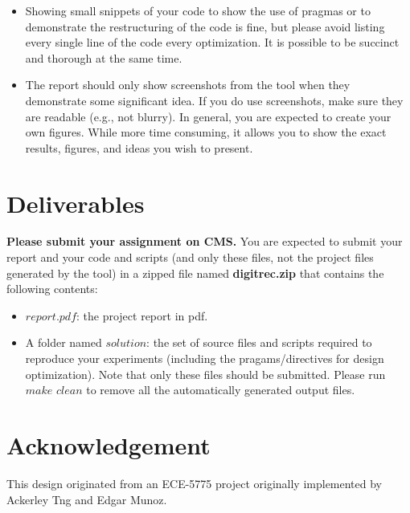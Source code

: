 \documentclass[paper=letter, fontsize=10pt]{scrartcl} %
\numberwithin{equation}{section} %
\numberwithin{figure}{section} %
\numberwithin{table}{section} %
\begin{document}
\begin{itemize}
\item Showing small snippets of your code to show the use of pragmas or to demonstrate the restructuring of the code is fine, but please avoid listing every single line of the code every optimization. It is possible to be succinct and thorough at the same time.

\item The report should only show screenshots from the tool when they demonstrate some significant idea. If you do use screenshots, make sure they are readable (e.g., not blurry). In general, you are expected to create your own figures. While more time consuming, it allows you to show the exact results, figures, and ideas you wish to present.

\end{itemize}

\section{Deliverables}
\label{deliverables}
\textbf{Please submit your assignment on CMS.} You are expected to submit your report and your code and scripts (and only these files, not the project files generated by the tool) in a zipped file named \textbf{digitrec.zip} that contains the following contents:
\begin{itemize}
	\item $report.pdf$: the project report in pdf.
    \item A folder named $solution$: the set of source files and scripts required to reproduce your experiments (including the pragams/directives for design optimization).  
    Note that only these files should be submitted. Please run $make$ $clean$ to remove all the automatically generated output files. 
\end{itemize}


\section{Acknowledgement}
This design originated from an ECE-5775 project originally implemented by Ackerley Tng and Edgar Munoz. 
\end{document}
